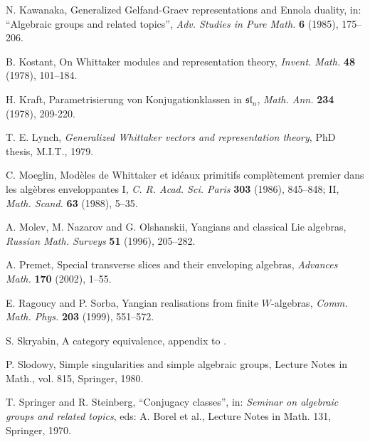 \documentclass[twoside,12pt,reqno]{amsart}
\begin{document}
\begin{thebibliography}{GKLLRT}
N. Kawanaka,
Generalized Gelfand-Graev representations and Ennola duality,
in: ``Algebraic groups and related topics'',
{\em Adv. Studies in Pure Math.} {\bf 6} (1985), 175--206.

B. Kostant,
On Whittaker modules and representation theory,
{\em Invent. Math.} {\bf 48} (1978), 101--184.

H. Kraft,
Parametrisierung von Konjugationklassen in $\mathfrak{sl}_n$, 
{\em Math.
Ann.} {\bf 234} (1978), 209-220.

T. E. Lynch,
{\em Generalized Whittaker vectors and representation theory},
PhD thesis, M.I.T., 1979.

C. Moeglin,
{Mod\`eles de Whittaker et id\'eaux primitifs compl\`etement premier
dans les alg\`ebres enveloppantes I},
{\em C. R. Acad. Sci. Paris} {\bf 303} (1986), 845--848;
II, {\em Math. Scand.} {\bf 63} (1988), 5--35.

A. Molev, M. Nazarov and G. Olshanskii,
Yangians and classical Lie algebras,
{\em Russian Math. Surveys} {\bf 51} (1996), 205--282.

A. Premet,
Special transverse slices and their enveloping algebras,
{\em Advances Math.}
{\bf 170} (2002), 1--55.

E. Ragoucy and P. Sorba,
Yangian realisations from finite $W$-algebras,
{\em Comm. Math. Phys.} {\bf 203} (1999), 551--572.


S. Skryabin, A category equivalence,
appendix to \cite{P}.

P. Slodowy,
Simple singularities and simple algebraic groups,
Lecture Notes in Math., vol. 815,
Springer, 1980.

T. Springer and R. Steinberg,
``Conjugacy classes'',
in: {\em Seminar on algebraic groups and related topics},
eds: A. Borel et al.,
Lecture Notes in Math. 131, Springer, 1970.

\end{thebibliography}
\end{document}
